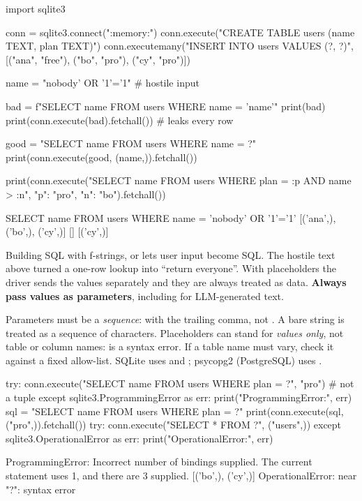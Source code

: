 \begin{pycode}
import sqlite3

conn = sqlite3.connect(":memory:")
conn.execute("CREATE TABLE users (name TEXT, plan TEXT)")
conn.executemany("INSERT INTO users VALUES (?, ?)",
                 [("ana", "free"), ("bo", "pro"), ("cy", "pro")])

name = "nobody' OR '1'='1"                 # hostile input

bad = f"SELECT name FROM users WHERE name = '{name}'"
print(bad)
print(conn.execute(bad).fetchall())        # leaks every row

good = "SELECT name FROM users WHERE name = ?"
print(conn.execute(good, (name,)).fetchall())

print(conn.execute("SELECT name FROM users WHERE plan = :p AND name > :n",
                   {"p": "pro", "n": "bo"}).fetchall())
\end{pycode}
\begin{rawcode}
SELECT name FROM users WHERE name = 'nobody' OR '1'='1'
[('ana',), ('bo',), ('cy',)]
[]
[('cy',)]
\end{rawcode}

\begin{trap}
Building SQL with f-strings, \code{\%} or \code{+} lets user input become SQL. The
hostile text above turned a one-row lookup into ``return everyone''. With 
placeholders the driver sends the values separately and they are always treated as data.
\textbf{Always pass values as parameters}, including for LLM-generated text.
\end{trap}

\begin{typecheck}
Parameters must be a \emph{sequence}:  with the trailing comma, not
. A bare string is treated as a sequence of characters.
Placeholders can stand for \emph{values only}, not table or column names:  is a syntax error. If a table name must vary, check it against a fixed allow-list.
SQLite uses  and ; psycopg2 (PostgreSQL) uses .
\end{typecheck}

\begin{pycode}
try:
    conn.execute("SELECT name FROM users WHERE plan = ?",
                 "pro")                       # not a tuple
except sqlite3.ProgrammingError as err:
    print("ProgrammingError:", err)
sql = "SELECT name FROM users WHERE plan = ?"
print(conn.execute(sql, ("pro",)).fetchall())
try:
    conn.execute("SELECT * FROM ?", ("users",))
except sqlite3.OperationalError as err:
    print("OperationalError:", err)
\end{pycode}
\begin{rawcode}
ProgrammingError: Incorrect number of bindings supplied. The current statement uses 1, and there are 3 supplied.
[('bo',), ('cy',)]
OperationalError: near "?": syntax error
\end{rawcode}

